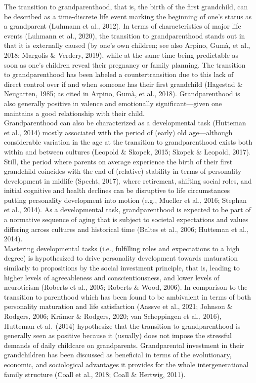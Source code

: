 \documentclass[
  english,
  man, noextraspace]{apa7}
\begin{document}
The transition to grandparenthood, that is, the birth of the first grandchild, can be described as a time-discrete life event marking the beginning of one's status as a grandparent (Luhmann et al., 2012). In terms of characteristics of major life events (Luhmann et al., 2020), the transition to grandparenthood stands out in that it is externally caused (by one's own children; see also Arpino, Gumà, et al., 2018; Margolis \& Verdery, 2019), while at the same time being predictable as soon as one's children reveal their pregnancy or family planning. The transition to grandparenthood has been labeled a countertransition due to this lack of direct control over if and when someone has their first grandchild (Hagestad \& Neugarten, 1985; as cited in Arpino, Gumà, et al., 2018). Grandparenthood is also generally positive in valence and emotionally significant---given one maintains a good relationship with their child.\\
Grandparenthood can also be characterized as a developmental task (Hutteman et al., 2014) mostly associated with the period of (early) old age---although considerable variation in the age at the transition to grandparenthood exists both within and between cultures (Leopold \& Skopek, 2015; Skopek \& Leopold, 2017). Still, the period where parents on average experience the birth of their first grandchild coincides with the end of (relative) stability in terms of personality development in midlife (Specht, 2017), where retirement, shifting social roles, and initial cognitive and health declines can be disruptive to life circumstances putting personality development into motion (e.g., Mueller et al., 2016; Stephan et al., 2014). As a developmental task, grandparenthood is expected to be part of a normative sequence of aging that is subject to societal expectations and values differing across cultures and historical time (Baltes et al., 2006; Hutteman et al., 2014).\\
Mastering developmental tasks (i.e., fulfilling roles and expectations to a high degree) is hypothesized to drive personality development towards maturation similarly to propositions by the social investment principle, that is, leading to higher levels of agreeableness and conscientiousness, and lower levels of neuroticism (Roberts et al., 2005; Roberts \& Wood, 2006). In comparison to the transition to parenthood which has been found to be ambivalent in terms of both personality maturation and life satisfaction (Aassve et al., 2021; Johnson \& Rodgers, 2006; Krämer \& Rodgers, 2020; van Scheppingen et al., 2016), Hutteman et al.~(2014) hypothesize that the transition to grandparenthood is generally seen as positive because it (usually) does not impose the stressful demands of daily childcare on grandparents. Grandparental investment in their grandchildren has been discussed as beneficial in terms of the evolutionary, economic, and sociological advantages it provides for the whole intergenerational family structure (Coall et al., 2018; Coall \& Hertwig, 2011).\\
\end{document}
